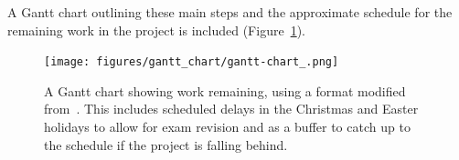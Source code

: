 \documentclass[12pt]{article}
\begin{document}
    A Gantt chart outlining these main steps and the approximate schedule for the remaining work in the project is included (Figure~\ref{fig:gantt-chart_}).

    \begin{landscape}
        \begin{figure}[p] %
            \centering
            \texttt{[image: figures/gantt\_chart/gantt-chart\_.png]}
            \caption{A Gantt chart showing work remaining, using a format modified from~\cite{DataCampGanttChart2021}. This includes scheduled delays in the Christmas and Easter holidays to allow for exam revision and as a buffer to catch up to the schedule if the project is falling behind.}
            \label{fig:gantt-chart_}
        \end{figure}
    \end{landscape}

    \FloatBarrier



    \newpage
    \printbibliography
    \newpage
    
\end{document}
